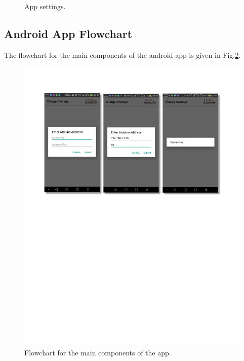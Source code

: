 \begin{enumerate}
\begin{figure}[H]
        \caption{App settings.}
        \label{fig:appSettings}
    \end{figure}
\end{enumerate}




\subsection{Android App Flowchart}
The flowchart for the main components of the android app is given in Fig.\ref{fig:Flowchart}.
\begin{figure}[h]
    \centering
    \includegraphics[width=\textwidth,page=4]{figures/androidFigs}
    \caption{Flowchart for the main components of the app.}
    \label{fig:Flowchart}
\end{figure}


